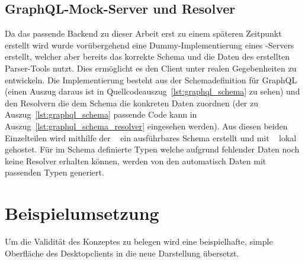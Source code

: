 

\subsection{GraphQL-Mock-Server und Resolver}
Da das passende Backend zu dieser Arbeit erst zu einem späteren Zeitpunkt erstellt wird wurde vorübergehend eine Dummy-Implementierung eines -Servers erstellt, welcher aber bereits das korrekte Schema und die Daten des erstellten Parser-Tools nutzt. Dies ermöglicht es den Client unter realen Gegebenheiten zu entwickeln. Die Implementierung besteht aus der Schemadefinition für GraphQL (einen Auszug daraus ist in Quellcodeauszug~\ref{lst:graphql_schema} zu sehen) und den Resolvern die dem Schema die konkreten Daten zuordnen (der zu Auszug~\ref{lst:graphql_schema} passende Code kann in Auszug~\ref{lst:graphql_schema_resolver} eingesehen werden). Aus diesen beiden Einzelteilen wird mithilfe der ~\parencite{apollo_graphql-tools_2019} ein ausführbares Schema erstellt und mit ~\parencite{express_graphql_2018} lokal gehostet. Für im Schema definierte Typen welche aufgrund fehlender Daten noch keine Resolver erhalten können, werden von den  automatisch Daten mit passenden Typen generiert.





\section{Beispielumsetzung}
Um die Validität des Konzeptes zu belegen wird eine beispielhafte, simple Oberfläche des  Desktopclients in die neue Darstellung übersetzt.\\
